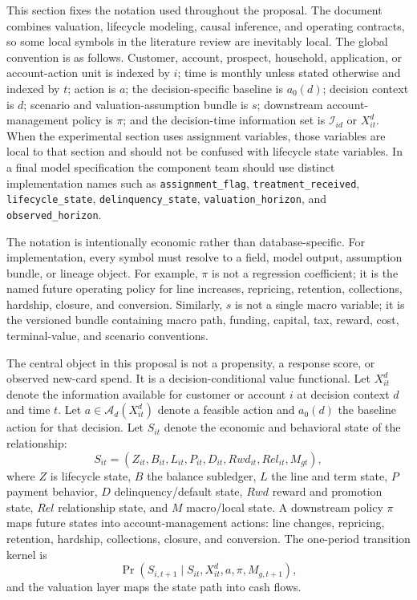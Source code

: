 \documentclass[11pt]{article}
\newcommand{\1}{\mathbf{1}}
\newcommand{\code}[1]{\nolinkurl{#1}}
\begin{document}
This section fixes the notation used throughout the proposal. The document
combines valuation, lifecycle modeling, causal inference, and operating
contracts, so some local symbols in the literature review are inevitably
local. The global convention is as follows. Customer, account, prospect,
household, application, or account-action unit is indexed by $i$; time is
monthly unless stated otherwise and indexed by $t$; action is $a$; the
decision-specific baseline is $a_0(d)$; decision context is $d$; scenario and
valuation-assumption bundle is $s$; downstream account-management policy is
$\pi$; and the decision-time information set is $\mathcal{I}_{id}$ or
$X_{it}^{d}$. When the experimental section uses assignment variables, those
variables are local to that section and should not be confused with lifecycle
state variables. In a final model specification the component team should use
distinct implementation names such as \code{assignment_flag},
\code{treatment_received}, \code{lifecycle_state}, \code{delinquency_state},
\code{valuation_horizon}, and \code{observed_horizon}.

The notation is intentionally economic rather than database-specific. For
implementation, every symbol must resolve to a field, model output, assumption
bundle, or lineage object. For example, $\pi$ is not a regression coefficient;
it is the named future operating policy for line increases, repricing,
retention, collections, hardship, closure, and conversion. Similarly, $s$ is
not a single macro variable; it is the versioned bundle containing macro path,
funding, capital, tax, reward, cost, terminal-value, and scenario conventions.

The central object in this proposal is not a propensity, a response score, or
observed new-card spend. It is a decision-conditional value functional. Let
$X_{it}^{d}$ denote the information available for customer or account $i$ at
decision context $d$ and time $t$. Let $a\in\mathcal{A}_d(X_{it}^{d})$ denote
a feasible action and $a_0(d)$ the baseline action for that decision. Let
$S_{it}$ denote the economic and behavioral state of the relationship:
\[
  S_{it}
  =
  (Z_{it},B_{it},L_{it},P_{it},D_{it},Rwd_{it},Rel_{it},M_{gt}),
\]
where $Z$ is lifecycle state, $B$ the balance subledger, $L$ the line and term
state, $P$ payment behavior, $D$ delinquency/default state, $Rwd$ reward and
promotion state, $Rel$ relationship state, and $M$ macro/local state. A
downstream policy $\pi$ maps future states into account-management actions:
line changes, repricing, retention, hardship, collections, closure, and
conversion. The one-period transition kernel is
\begin{equation}
  \Pr(S_{i,t+1}\mid S_{it},X_{it}^{d},a,\pi,M_{g,t+1}),
  \label{eq:state-kernel-panel}
\end{equation}
and the valuation layer maps the state path into cash flows.
\end{document}

